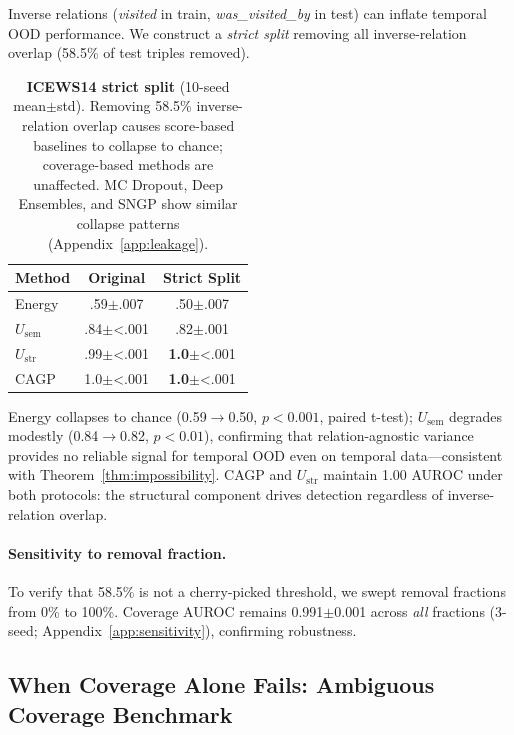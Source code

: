 Inverse relations (\emph{visited} in train, \emph{was\_visited\_by} in test) can inflate temporal OOD performance. We construct a \emph{strict split} removing all inverse-relation overlap (58.5\% of test triples removed).

\begin{table}[t]
\centering
\caption{\textbf{ICEWS14 strict split} (10-seed mean$\pm$std). Removing 58.5\% inverse-relation overlap causes score-based baselines to collapse to chance; coverage-based methods are unaffected. MC Dropout, Deep Ensembles, and SNGP show similar collapse patterns (Appendix~\ref{app:leakage}).\label{tab:strict_split}}
\small
\begin{tabular}{lcc}
\toprule
Method & Original & Strict Split \\
\midrule
Energy & .59$\pm$.007 & .50$\pm$.007 \\
$U_{\text{sem}}$ & .84$\pm${\textless}.001 & .82$\pm$.001 \\
$U_{\text{str}}$ & .99$\pm${\textless}.001 & \textbf{1.0}$\pm${\textless}.001 \\
CAGP & 1.0$\pm${\textless}.001 & \textbf{1.0}$\pm${\textless}.001 \\
\bottomrule
\end{tabular}
\end{table}

Energy collapses to chance (0.59$\to$0.50, $p < 0.001$, paired t-test); $U_{\text{sem}}$ degrades modestly (0.84$\to$0.82, $p < 0.01$), confirming that relation-agnostic variance provides no reliable signal for temporal OOD even on temporal data---consistent with Theorem~\ref{thm:impossibility}. CAGP and $U_{\text{str}}$ maintain 1.00 AUROC under both protocols: the structural component drives detection regardless of inverse-relation overlap.

\paragraph{Sensitivity to removal fraction.}
To verify that 58.5\% is not a cherry-picked threshold, we swept removal fractions from 0\% to 100\%. Coverage AUROC remains 0.991$\pm$0.001 across \emph{all} fractions (3-seed; Appendix~\ref{app:sensitivity}), confirming robustness.

\subsection{When Coverage Alone Fails: Ambiguous Coverage Benchmark}
\label{sec:ambiguous_coverage}

